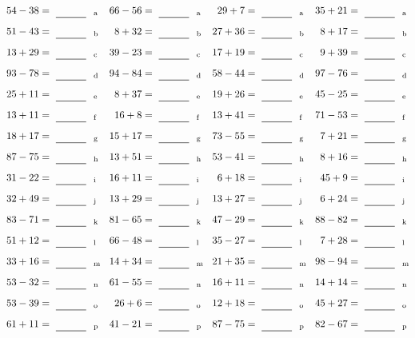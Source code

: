 \documentclass
[
  draft    = true,
  fontsize = 11pt,
  parskip  = half-
]
{scrartcl}
\begin{document}
\clearpage
\begin{align*}
    \pline{54-38}&=\rline{a}
  & \pline{66-56}&=\rline{a}
  & \pline{29+7}&=\rline{a}
  & \pline{35+21}&=\rline{a} \\[1ex]
    \pline{51-43}&=\rline{b}
  & \pline{8+32}&=\rline{b}
  & \pline{27+36}&=\rline{b}
  & \pline{8+17}&=\rline{b} \\[1ex]
    \pline{13+29}&=\rline{c}
  & \pline{39-23}&=\rline{c}
  & \pline{17+19}&=\rline{c}
  & \pline{9+39}&=\rline{c} \\[1ex]
    \pline{93-78}&=\rline{d}
  & \pline{94-84}&=\rline{d}
  & \pline{58-44}&=\rline{d}
  & \pline{97-76}&=\rline{d} \\[1ex]
    \pline{25+11}&=\rline{e}
  & \pline{8+37}&=\rline{e}
  & \pline{19+26}&=\rline{e}
  & \pline{45-25}&=\rline{e} \\[1ex]
    \pline{13+11}&=\rline{f}
  & \pline{16+8}&=\rline{f}
  & \pline{13+41}&=\rline{f}
  & \pline{71-53}&=\rline{f} \\[1ex]
    \pline{18+17}&=\rline{g}
  & \pline{15+17}&=\rline{g}
  & \pline{73-55}&=\rline{g}
  & \pline{7+21}&=\rline{g} \\[1ex]
    \pline{87-75}&=\rline{h}
  & \pline{13+51}&=\rline{h}
  & \pline{53-41}&=\rline{h}
  & \pline{8+16}&=\rline{h} \\[1ex]
    \pline{31-22}&=\rline{i}
  & \pline{16+11}&=\rline{i}
  & \pline{6+18}&=\rline{i}
  & \pline{45+9}&=\rline{i} \\[1ex]
    \pline{32+49}&=\rline{j}
  & \pline{13+29}&=\rline{j}
  & \pline{13+27}&=\rline{j}
  & \pline{6+24}&=\rline{j} \\[1ex]
    \pline{83-71}&=\rline{k}
  & \pline{81-65}&=\rline{k}
  & \pline{47-29}&=\rline{k}
  & \pline{88-82}&=\rline{k} \\[1ex]
    \pline{51+12}&=\rline{l}
  & \pline{66-48}&=\rline{l}
  & \pline{35-27}&=\rline{l}
  & \pline{7+28}&=\rline{l} \\[1ex]
    \pline{33+16}&=\rline{m}
  & \pline{14+34}&=\rline{m}
  & \pline{21+35}&=\rline{m}
  & \pline{98-94}&=\rline{m} \\[1ex]
    \pline{53-32}&=\rline{n}
  & \pline{61-55}&=\rline{n}
  & \pline{16+11}&=\rline{n}
  & \pline{14+14}&=\rline{n} \\[1ex]
    \pline{53-39}&=\rline{o}
  & \pline{26+6}&=\rline{o}
  & \pline{12+18}&=\rline{o}
  & \pline{45+27}&=\rline{o} \\[1ex]
    \pline{61+11}&=\rline{p}
  & \pline{41-21}&=\rline{p}
  & \pline{87-75}&=\rline{p}
  & \pline{82-67}&=\rline{p}
\end{align*}
\end{document}
